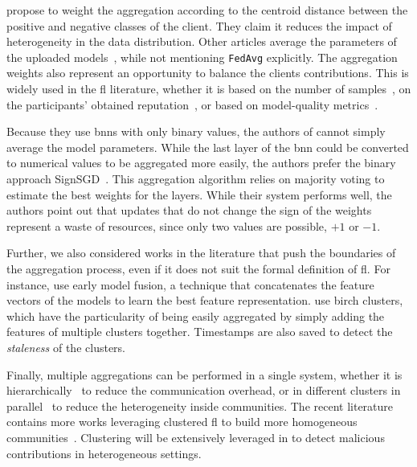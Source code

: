 \textcite{zhang_BlockchainbasedFederatedLearning_2020} propose to weight the aggregation according to the centroid distance between the positive and negative classes of the client.
They claim it reduces the impact of heterogeneity in the data distribution.
Other articles average the parameters of the uploaded models~\cite{schneble_Attackdetectionusing_2019,chen_Networkanomalydetection_2020}, while not mentioning \texttt{FedAvg} explicitly.
The aggregation weights also represent an opportunity to balance the clients contributions.
This is widely used in the \gls{fl} literature, whether it is based on the number of samples~\cite{mcmahan_Communicationefficientlearningdeep_2017}, on the participants' obtained reputation~\cite{wang_FLAREDefendingFederated_2022,wang_ReputationenabledFederatedLearning_2021}, or based on model-quality metrics~\cite{deng_FAIRQualityAwareFederated_2021}.

Because they use \glspl{bnn} with only binary values, the authors of \cite{qin_LineSpeedScalableIntrusion_2020a} cannot simply average the model parameters.
While the last layer of the \gls{bnn} could be converted to numerical values to be aggregated more easily, the authors prefer the binary approach SignSGD~\cite{bernstein_signSGDCompressedoptimisation_2018}.
This aggregation algorithm relies on majority voting to estimate the best weights for the layers.
While their system performs well, the authors point out that updates that do not change the sign of the weights represent a waste of resources, since only two values are possible, $+1$ or $-1$.

Further, we also considered works in the literature that push the boundaries of the aggregation process, even if it does not suit the formal definition of \gls{fl}.
For instance, \textcite{rathore_BlockSecIoTNetBlockchainbaseddecentralized_2019} use early model fusion, a technique that concatenates the feature vectors of the models to learn the best feature representation.
\textcite{pahl_AllEyesYou_2018} use \gls{birch} clusters, which have the particularity of being easily aggregated by simply adding the features of multiple clusters together.
Timestamps are also saved to detect the \emph{staleness} of the clusters.

Finally, multiple aggregations can be performed in a single system, whether it is hierarchically~\cite{liu_BlockchainFederatedLearning_2021} to reduce the communication overhead, or in different clusters in parallel~\cite{sun_IntrusionDetectionSegmented_2020,sun_AdaptiveIntrusionDetection_2021} to reduce the heterogeneity inside communities.
The recent literature contains more works leveraging clustered \gls{fl} to build more homogeneous communities~\cite{cai_ClusterbasedFederatedLearning_2022,shan_CFLIDSEffectiveClustered_2024}.
Clustering will be extensively leveraged in  to detect malicious contributions in heterogeneous settings.


